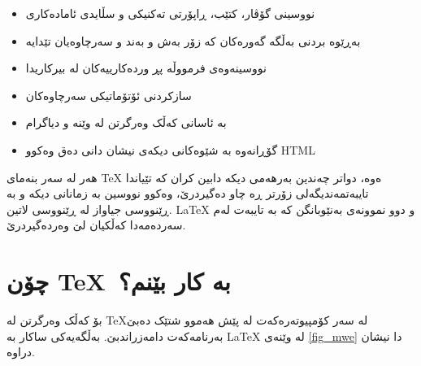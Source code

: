\documentclass[14pt]{article}
\begin{document}
\begin{itemize}
\item نووسینی گۆڤار، کتێب، ڕاپۆرتی تەکنیکی و سڵایدی ئامادەکاری
\item بەڕێوە بردنی بەڵگە گەورەکان کە زۆر بەش و بەند و سەرچاوەیان تێدایە
\item نووسینەوەی فرمووڵە پڕ وردەکارییەکان لە بیرکاریدا
\item سازکردنی ئۆتۆماتیکی سەرچاوەکان
\item بە ئاسانی کەڵک وەرگرتن لە وێنە و دیاگرام
\item گۆڕانەوە بە شێوەکانی دیکەی نیشان دانی دەق وەکوو HTML
\end{itemize}

هەر لە سەر بنەمای
\textenglish{\TeX}
ەوە، دواتر چەندین بەرهەمی دیکە دابین کران کە تێیاندا تایبەتمەندیگەلی زۆرتر ڕە چاو دەگیردرێ، وەکوو نووسین بە زمانانی دیکە و بە ڕێنووسی جیاواز لە ڕێنووسی لاتین. 
\textenglish{\LaTeX} 
و 
\textenglish{\XeLaTeX}
دوو نموونەی بەنێوبانگن کە بە تایبەت لەم سەردەمەدا کەڵکیان لێ وەردەگیردرێ.

\section{چۆن \TeX~بە کار بێنم؟}

بۆ کەڵک وەرگرتن لە \TeX لە سەر کۆمپیوتەرەکەت لە پێش هەموو شتێک دەبێ بەرنامەکەت دامەزراندبێ. بەڵگەیەکی ساکار بە 
\textenglish{\LaTeX} 
 لە وێنەی
\ref{fig_mwe}
دا نیشان دراوە.
\end{document}
